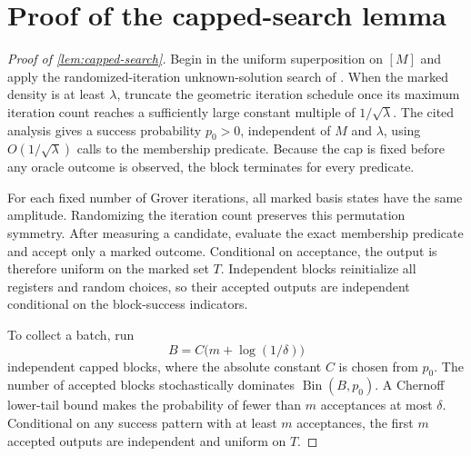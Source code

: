 \section{Proof of the capped-search lemma}\label{app:capped-search}

\begin{proof}[Proof of \cref{lem:capped-search}]
Begin in the uniform superposition on $[M]$ and apply the randomized-iteration
unknown-solution search of \cite{BBHT1998}.  When the marked density is at
least $\lambda$, truncate the geometric iteration schedule once its maximum
iteration count reaches a sufficiently large constant multiple of
$1/\sqrt\lambda$.  The cited analysis gives a success probability $p_0>0$,
independent of $M$ and $\lambda$, using $O(1/\sqrt\lambda)$ calls to the
membership predicate.  Because the cap is fixed before any oracle outcome is
observed, the block terminates for every predicate.

For each fixed number of Grover iterations, all marked basis states have the
same amplitude.  Randomizing the iteration count preserves this permutation
symmetry.  After measuring a candidate, evaluate the exact membership
predicate and accept only a marked outcome.  Conditional on acceptance, the
output is therefore uniform on the marked set $T$.  Independent blocks
reinitialize all registers and random choices, so their accepted outputs are
independent conditional on the block-success indicators.

To collect a batch, run
\[
 B=C\bigl(m+\log(1/\delta)\bigr)
\]
independent capped blocks, where the absolute constant $C$ is chosen from
$p_0$.  The number of accepted blocks stochastically dominates
$\operatorname{Bin}(B,p_0)$.  A Chernoff lower-tail bound
\cite{Chernoff1952} makes the probability of fewer than $m$ acceptances at
most $\delta$.  Conditional on any success pattern with at least $m$
acceptances, the first $m$ accepted outputs are independent and uniform on
$T$.
\end{proof}
